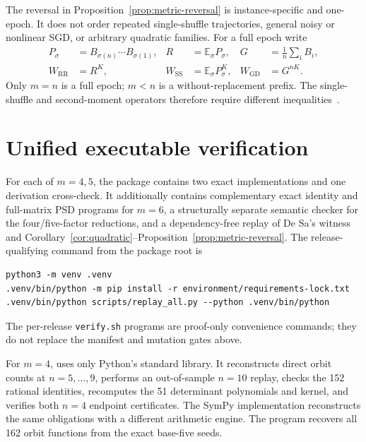 \documentclass[11pt]{article}
\begin{document}
The reversal in Proposition~\ref{prop:metric-reversal} is instance-specific
and one-epoch.  It does not order repeated single-shuffle trajectories,
general noisy or nonlinear SGD, or arbitrary quadratic families.  For a full
epoch write
\begin{align*}
 P_\sigma&=B_{\sigma(n)}\cdots B_{\sigma(1)},
 &R&=\mathbb E_\sigma P_\sigma,
 &G&=\frac1n\sum_iB_i,\\
 W_{\mathrm{RR}}&=R^K,
 &W_{\mathrm{SS}}&=\mathbb E_\sigma P_\sigma^K,
 &W_{\mathrm{GD}}&=G^{nK}.
\end{align*}
Only \(m=n\) is a full epoch; \(m<n\) is a without-replacement prefix.
The single-shuffle and second-moment operators therefore require different
inequalities~\cite{YunSraJadbabaie2021,Peng2026,Liu2026}.

\section{Unified executable verification}\label{sec:verification}

For each of \(m=4,5\), the package contains two exact implementations and one
derivation cross-check.  It additionally contains complementary exact
identity and full-matrix PSD programs for \(m=6\), a structurally separate
semantic checker for the four/five-factor reductions, and a dependency-free
replay of De Sa's witness and
Corollary~\ref{cor:quadratic}--Proposition~\ref{prop:metric-reversal}.  The
release-qualifying command from the package root is
\begin{verbatim}
python3 -m venv .venv
.venv/bin/python -m pip install -r environment/requirements-lock.txt
.venv/bin/python scripts/replay_all.py --python .venv/bin/python
\end{verbatim}
The per-release \texttt{verify.sh} programs are proof-only convenience
commands; they do not replace the manifest and mutation gates above.

For \(m=4\),  uses only Python's standard library.  It reconstructs direct orbit counts at \(n=5,\ldots,9\), performs an out-of-sample \(n=10\) replay, checks the 152 rational identities, recomputes the 51 determinant polynomials and kernel, and verifies both \(n=4\) endpoint certificates.  The SymPy implementation
 reconstructs the same obligations with a different arithmetic engine.  The program
 recovers all 162 orbit functions from the exact base-five seeds.
\end{document}
